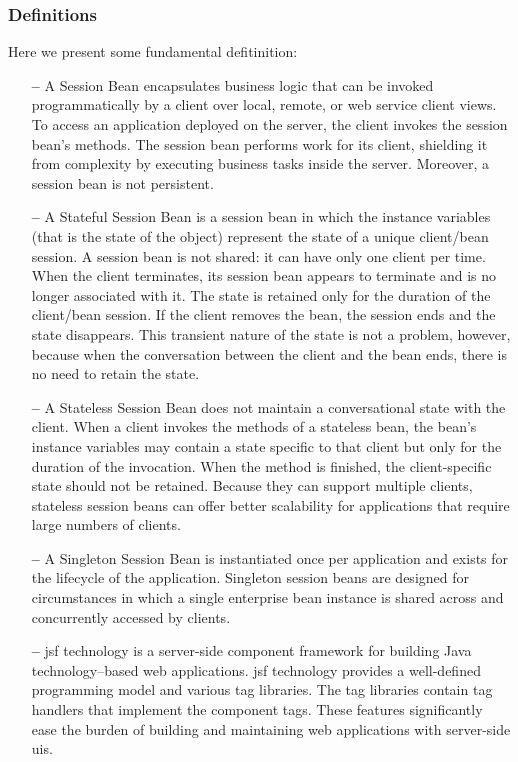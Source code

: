 \subsubsection{Definitions} \label{def}
Here we present some fundamental defitinition:
\begin{itemize}
\item[\textbf{--}] A \textsf{Session Bean} encapsulates business logic that can be invoked programmatically by a client over local, remote, or web service client views. To access an application deployed on the server, the client invokes the session bean's methods. The session bean performs work for its client, shielding it from complexity by executing business tasks inside the server. Moreover, a session bean is not persistent. 

\item[\textbf{--}] A \textsf{Stateful Session Bean} is a session bean in which the instance variables (that is the state of the object) represent the state of a unique client/bean session.
A session bean is not shared: it can have only one client per time. When the client terminates, its session bean appears to terminate and is no longer associated with it.
The state is retained only for the duration of the client/bean session. If the client removes the bean, the session ends and the state disappears. This transient nature of the state is not a problem, however, because when the conversation between the client and the bean ends, there is no need to retain the state.

\item[\textbf{--}] A \textsf{Stateless Session Bean} does not maintain a conversational state with the client. When a client invokes the methods of a stateless bean, the bean's instance variables may contain a state specific to that client but only for the duration of the invocation. When the method is finished, the client-specific state should not be retained. 
Because they can support multiple clients, stateless session beans can offer better scalability for applications that require large numbers of clients.

\item[\textbf{--}] A \textsf{Singleton Session Bean} is instantiated once per application and exists for the lifecycle of the application. Singleton session beans are designed for circumstances in which a single enterprise bean instance is shared across and concurrently accessed by clients.

\item[\textbf{--}] \textsf{\acl{jsf}} technology is a server-side component framework for building Java technology–based web applications.
\acs{jsf} technology provides a well-defined programming model and various tag libraries. The tag libraries contain tag handlers that implement the component tags. These features significantly ease the burden of building and maintaining web applications with server-side \acs{ui}s.

\end{itemize}

